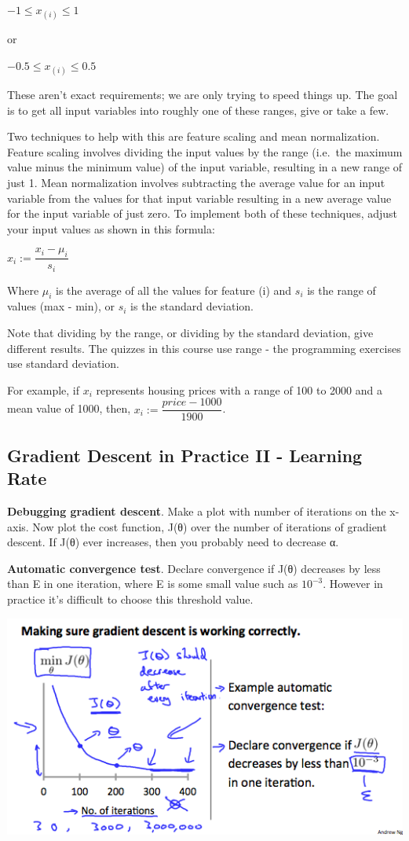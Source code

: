 \documentclass[
]{article}
\begin{document}
\(−1 ≤ x_{(i)} ≤ 1\)

or

\(−0.5 ≤ x_{(i)} ≤ 0.5\)

These aren't exact requirements; we are only trying to speed things up.
The goal is to get all input variables into roughly one of these ranges,
give or take a few.

Two techniques to help with this are feature scaling and mean
normalization. Feature scaling involves dividing the input values by the
range (i.e.~the maximum value minus the minimum value) of the input
variable, resulting in a new range of just 1. Mean normalization
involves subtracting the average value for an input variable from the
values for that input variable resulting in a new average value for the
input variable of just zero. To implement both of these techniques,
adjust your input values as shown in this formula:

\(x_i := \dfrac{x_i - \mu_i}{s_i}\)

Where \(\mu_i\) is the average of all the values for feature (i) and
\(s_i\) is the range of values (max - min), or \(s_i\) is the standard
deviation.

Note that dividing by the range, or dividing by the standard deviation,
give different results. The quizzes in this course use range - the
programming exercises use standard deviation.

For example, if \(x_i\) represents housing prices with a range of 100 to
2000 and a mean value of 1000, then,
\(x_i := \dfrac{price-1000}{1900}\).

\hypertarget{gradient-descent-in-practice-ii---learning-rate}{%
\subsection{Gradient Descent in Practice II - Learning
Rate}\label{gradient-descent-in-practice-ii---learning-rate}}

\textbf{Debugging gradient descent}. Make a plot with number of
iterations on the x-axis. Now plot the cost function, J(θ) over the
number of iterations of gradient descent. If J(θ) ever increases, then
you probably need to decrease α.

\textbf{Automatic convergence test}. Declare convergence if J(θ)
decreases by less than E in one iteration, where E is some small value
such as \(10^{−3}\). However in practice it's difficult to choose this
threshold value.

\includegraphics{Gradient Descent in Practice II - Learning Rate graph1.png}
\end{document}
